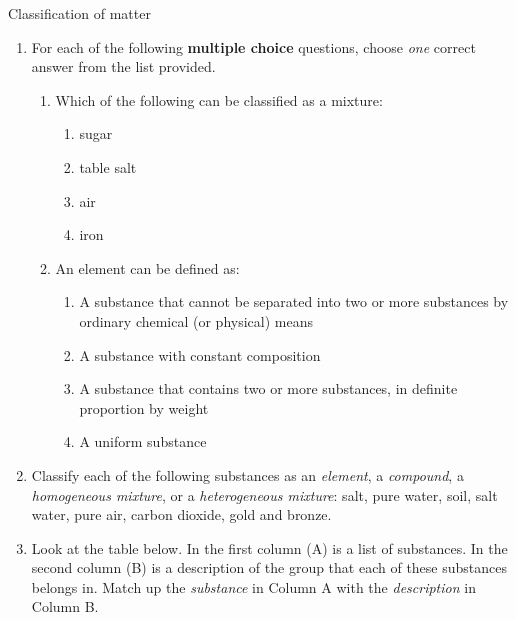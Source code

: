 \label{m38706*secfhsst!!!underscore!!!id672}
            \begin{eocexercises}{Classification of matter }{
            \nopagebreak
      \label{m38706*id67920}\begin{enumerate}[noitemsep, label=\textbf{\arabic*}. ] 
            \label{m38706*uid133}\item For each of the following \textbf{multiple choice} questions, choose \textsl{one} correct answer from the list provided.
\label{m38706*id67947}\begin{enumerate}[noitemsep, label=\textbf{\alph*}. ] 
            \label{m38706*uid134}\item Which of the following can be classified as a mixture:
\label{m38706*id67963}\begin{enumerate}[noitemsep, label=\textbf{\roman*}. ] 
            \label{m38706*uid135}\item sugar
\label{m38706*uid136}\item table salt
\label{m38706*uid137}\item air
\label{m38706*uid138}\item iron
\end{enumerate}
                \label{m38706*uid139}\item An element can be defined as:
\label{m38706*id68029}\begin{enumerate}[noitemsep, label=\textbf{\roman*}.] 
            \label{m38706*uid140}\item A substance that cannot be separated into two or more substances by ordinary chemical (or physical) means
\label{m38706*uid141}\item A substance with constant composition
\label{m38706*uid142}\item A substance that contains two or more substances, in definite proportion by weight
\label{m38706*uid143}\item A uniform substance
\end{enumerate}
                \end{enumerate}
\label{m38706*uid144}\item Classify each of the following substances as an \textsl{element}, a \textsl{compound}, a \textsl{homogeneous mixture}, or a \textsl{heterogeneous mixture}: salt, pure water, soil, salt water, pure air, carbon dioxide, gold and bronze.\newline
\label{m38706*uid145}\item Look at the table below. In the first column (A) is a list of substances. In the second column (B) is a description of the group that each of these substances belongs in. Match up the \textsl{substance} in Column A with the \textsl{description} in Column B.

\end{enumerate}}
\end{eocexercises}
